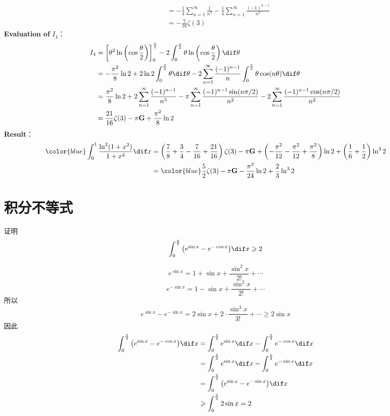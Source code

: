 \documentclass[color=green,titlestyle=hang]{elegantbook}%
\begin{document}
\begin{Solution}
\begin{align*}
&=-\frac{1}{4}\sum_{n=1}^{\infty}\frac{1}{n^3}-\frac{1}{4}\sum_{n=1}^{\infty}\frac{(-1)^{n-1}}{n^3}\\
&=-\frac{7}{16}\zeta(3)
\end{align*}
\textbf{Evaluation of} $I_4$：
\begin{align*}
I_4&=\left[\theta^2\ln\left(\cos\frac{\theta}{2}\right)\right]_0^{\frac{\pi}{2}}-2\int_0^{\frac{\pi}{2}}\theta\ln\left(\cos\frac{\theta}{2}\right)\dif\theta\\\
&=-\frac{\pi^2}{8}\ln2+2\ln2\int_0^{\frac{\pi}{2}}\theta\dif\theta-2\sum_{n=1}^{\infty}\frac{(-1)^{n-1}}{n}\int_0^{\frac{\pi}{2}}\theta\cos(n\theta)\dif\theta\\
&=\frac{\pi^2}{8}\ln2+2\sum_{n=1}^{\infty}\frac{(-1)^{n-1}}{n^3}-\pi\sum_{n=1}^{\infty}\frac{(-1)^{n-1}\sin(n\pi/2)}{n^2}-2\sum_{n=1}^{\infty}\frac{(-1)^{n-1}\cos(n\pi/2)}{n^2}\\
&=\frac{21}{16}\zeta(3)-\pi\mathrm{\mathbf{G}}+\frac{\pi^2}{8}\ln2
\end{align*}
\textbf{Result}：
\begin{align*}
\color{blue}\int_0^1\frac{\ln^2(1+x^2)}{1+x^2}\dif x
&=\left(\frac{7}{8}+\frac{3}{4}-\frac{7}{16}+\frac{21}{16}\right)\zeta(3)-\pi\mathrm{\mathbf{G}}+\left(-\frac{\pi^2}{12}-\frac{\pi^2}{12}+\frac{\pi^2}{8}\right)\ln2+\left(\frac{1}{6}+\frac{1}{2}\right)\ln^32\\
&=\color{blue}\frac{5}{2}\zeta(3)-\pi\mathrm{\mathbf{G}}-\frac{\pi^2}{24}\ln2+\frac{2}{3}\ln^32
\end{align*}
\end{Solution}

\section{积分不等式}

\begin{example}
证明\[\int_0^{\frac{\pi}{2}}\big(e^{\sin x}-e^{-\cos x}\big)\dif x\geqslant2\]
\end{example}\begin{newproof}
\[e^{\sin x}=1+\sin x+\frac{\sin^2x}{2!}+\cdots\]
\[e^{-\sin x}=1-\sin x+\frac{\sin^2x}{2!}+\cdots\]
所以\[e^{\sin x}-e^{-\sin x}=2\sin x+2\cdot\frac{\sin^3x}{3!}+\cdots\geqslant2\sin x\]
因此
\begin{align*}
\int_0^{\frac{\pi}{2}}\big(e^{\sin x}-e^{-\cos x}\big)\dif x
&=\int_0^{\frac{\pi}{2}}e^{\sin x}\dif x-\int_0^{\frac{\pi}{2}}e^{-\cos x}\dif x\\
&=\int_0^{\frac{\pi}{2}}e^{\sin x}\dif x-\int_0^{\frac{\pi}{2}}e^{-\sin x}\dif x\\
&=\int_0^{\frac{\pi}{2}}\big(e^{\sin x}-e^{-\sin x}\big)\dif x\\
&\geqslant\int_0^{\frac{\pi}{2}}2\sin x=2	
\end{align*}	
\end{newproof}
\end{document}
